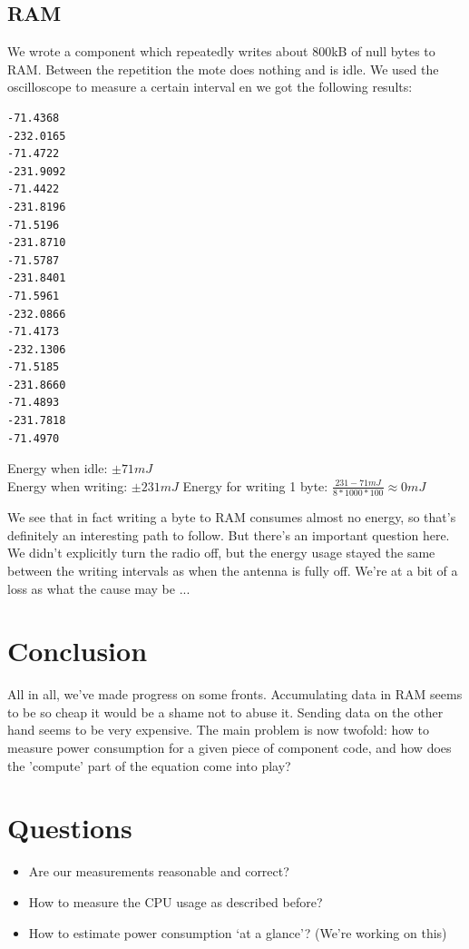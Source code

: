 \documentclass{article} \usepackage[utf8]{inputenc}
\begin{document}
\subsection{RAM}

We wrote a component which repeatedly writes about 800kB of null bytes
to RAM. Between the repetition the mote does nothing and is idle. We
used the oscilloscope to measure a certain interval en we got the
following results:

\begin{verbatim}
-71.4368
-232.0165
-71.4722
-231.9092
-71.4422
-231.8196
-71.5196
-231.8710
-71.5787
-231.8401
-71.5961
-232.0866
-71.4173
-232.1306
-71.5185
-231.8660
-71.4893
-231.7818
-71.4970
\end{verbatim}

Energy when idle: $\pm 71 mJ$\\
Energy when writing: $\pm 231 mJ$
Energy for writing 1 byte: $ \frac{231-71 mJ}{8*1000*100} \approx 0 mJ$

We see that in fact writing a byte to RAM consumes almost no
energy, so that's definitely an interesting path to follow. But there's
an important question here. We didn't explicitly turn the radio off,
but the energy usage stayed the same between the writing intervals as
when the antenna is fully off. We're at a bit of a loss as what the
cause may be ...

\section{Conclusion}

All in all, we've made progress on some fronts. Accumulating data in RAM seems to be so cheap it would be a shame not to abuse it. Sending data on the other hand seems to be very expensive. The main problem is now twofold: how to measure power consumption for a given piece of component code, and how does the 'compute' part of the equation come into play? 

\section{Questions}
\begin{itemize}
\item Are our measurements reasonable and correct?
\item How to measure the CPU usage as described before?
\item How to estimate power consumption `at a glance'? (We're working on this)
\end{itemize}
\end{document}

